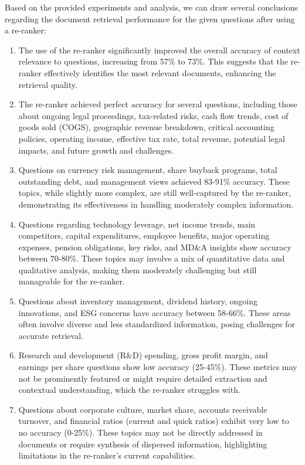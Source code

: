 Based on the provided experiments and analysis, we can draw several conclusions regarding the document retrieval performance for the given questions after using a re-ranker:
\begin{enumerate}
\item The use of the re-ranker significantly improved the overall accuracy of context relevance to questions, increasing from 57\% to 73\%. This suggests that the re-ranker effectively identifies the most relevant documents, enhancing the retrieval quality.
\item The re-ranker achieved perfect accuracy for several questions, including those about ongoing legal proceedings, tax-related risks, cash flow trends, cost of goods sold (COGS), geographic revenue breakdown, critical accounting policies, operating income, effective tax rate, total revenue, potential legal impacts, and future growth and challenges. 
\item Questions on currency risk management, share buyback programs, total outstanding debt, and management views achieved 83-91\% accuracy. These topics, while slightly more complex, are still well-captured by the re-ranker, demonstrating its effectiveness in handling moderately complex information.
\item Questions regarding technology leverage, net income trends, main competitors, capital expenditures, employee benefits, major operating expenses, pension obligations, key risks, and MD\&A insights show accuracy between 70-80\%. These topics may involve a mix of quantitative data and qualitative analysis, making them moderately challenging but still manageable for the re-ranker.
\item Questions about inventory management, dividend history, ongoing innovations, and ESG concerns have accuracy between 58-66\%. These areas often involve diverse and less standardized information, posing challenges for accurate retrieval.
\item Research and development (R\&D) spending, gross profit margin, and earnings per share questions show low accuracy (25-45\%). These metrics may not be prominently featured or might require detailed extraction and contextual understanding, which the re-ranker struggles with.
\item Questions about corporate culture, market share, accounts receivable turnover, and financial ratios (current and quick ratios) exhibit very low to no accuracy (0-25\%). These topics may not be directly addressed in documents or require synthesis of dispersed information, highlighting limitations in the re-ranker’s current capabilities.

\end{enumerate}

